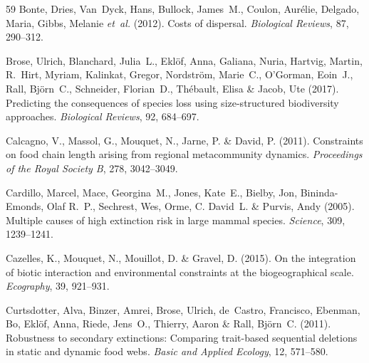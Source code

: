 \documentclass[11pt]{article}
\begin{document}
\begin{thebibliography}{59}
Bonte, Dries, Van~Dyck, Hans, Bullock, James~M., Coulon, Aurélie, Delgado,
  Maria, Gibbs, Melanie \emph{et~al.} (2012).
\newblock Costs of dispersal.
\newblock \emph{Biological Reviews}, 87, 290--312.

Brose, Ulrich, Blanchard, Julia~L., Eklöf, Anna, Galiana, Nuria, Hartvig,
  Martin, R.~Hirt, Myriam, Kalinkat, Gregor, Nordström, Marie~C., O'Gorman,
  Eoin~J., Rall, Björn~C., Schneider, Florian~D., Thébault, Elisa \& Jacob,
  Ute (2017).
\newblock Predicting the consequences of species loss using size-structured
  biodiversity approaches.
\newblock \emph{Biological Reviews}, 92, 684--697.

Calcagno, V., Massol, G., Mouquet, N., Jarne, P. \& David, P. (2011).
\newblock Constraints on food chain length arising from regional metacommunity
  dynamics.
\newblock \emph{Proceedings of the Royal Society B}, 278, 3042--3049.

Cardillo, Marcel, Mace, Georgina~M., Jones, Kate~E., Bielby, Jon,
  Bininda-Emonds, Olaf R.~P., Sechrest, Wes, Orme, C. David~L. \& Purvis, Andy
  (2005).
\newblock Multiple causes of high extinction risk in large mammal species.
\newblock \emph{Science}, 309, 1239--1241.

Cazelles, K., Mouquet, N., Mouillot, D. \& Gravel, D. (2015).
\newblock On the integration of biotic interaction and environmental
  constraints at the biogeographical scale.
\newblock \emph{Ecography}, 39, 921--931.

Curtsdotter, Alva, Binzer, Amrei, Brose, Ulrich, de~Castro, Francisco, Ebenman,
  Bo, Eklöf, Anna, Riede, Jens~O., Thierry, Aaron \& Rall, Björn~C. (2011).
\newblock Robustness to secondary extinctions: Comparing trait-based sequential
  deletions in static and dynamic food webs.
\newblock \emph{Basic and Applied Ecology}, 12, 571--580.


\end{thebibliography}
\end{document}
